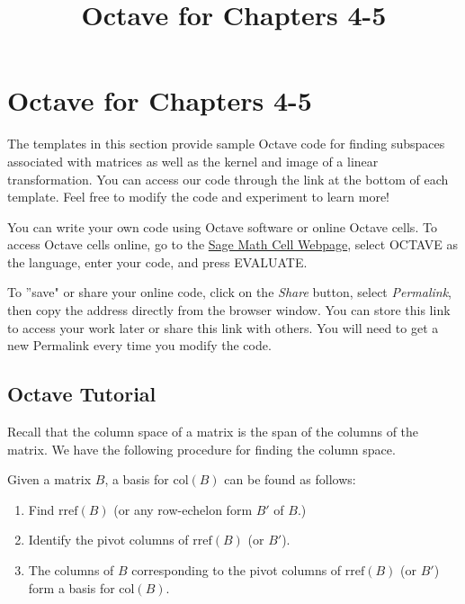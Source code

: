 \documentclass{ximera}
\title{Octave for Chapters 4-5} \license{CC BY-NC-SA 4.0}
\begin{document}
\begin{abstract}
\end{abstract}
\maketitle

\section*{Octave for Chapters 4-5}

The templates in this section provide sample Octave code for finding subspaces associated with matrices as well as the kernel and image of a linear transformation. You can access our code through the link at the bottom of each template.  Feel free to modify the code and experiment to learn more!  

You can write your own code using Octave software or online Octave cells.  To access Octave cells online, go to the \href{https://sagecell.sagemath.org/}{Sage Math Cell Webpage}, select OCTAVE as the language, enter your code, and press EVALUATE.  

To ''save" or share your online code, click on the \emph{Share} button, select \emph{Permalink}, then copy the address directly from the browser window.  You can store this link to access your work later or share this link with others.  You will need to get a new Permalink every time you modify the code.

\subsection*{Octave Tutorial}

Recall that the column space of a matrix is the span of the columns of the matrix.  We have the following procedure for finding the column space.

\begin{procedure}[\ref{proc:colspace}]
Given a matrix $B$, a basis for $\mbox{col}(B)$ can be found as follows:
\begin{enumerate}
\item Find $\mbox{rref}(B)$ (or any row-echelon form $B'$ of $B$.)
\item Identify the pivot columns of $\mbox{rref}(B)$ (or $B'$).
\item The columns of $B$ corresponding to the pivot columns of $\mbox{rref}(B)$ (or $B'$) form a basis for $\mbox{col}(B)$.
\end{enumerate}
\end{procedure}
\end{document}
